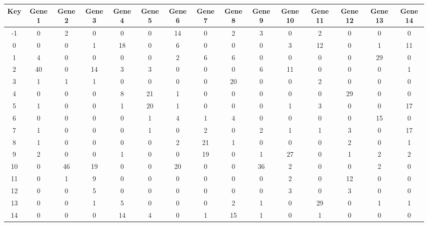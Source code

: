 \begin{tabular}{|c|c|c|c|c|c|c|c|c|c|c|c|c|c|c|}
\hline
Key & Gene 1 & Gene 2 & Gene 3 & Gene 4 & Gene 5 & Gene 6 & Gene 7 & Gene 8 & Gene 9 & Gene 10 & Gene 11 & Gene 12 & Gene 13 & Gene 14 \\
\hline
-1 & 0 & 2 & 0 & 0 & 0 & 14 & 0 & 2 & 3 & 0 & 2 & 0 & 0 & 0 \\
0 & 0 & 0 & 1 & 18 & 0 & 6 & 0 & 0 & 0 & 3 & 12 & 0 & 1 & 11 \\
1 & 4 & 0 & 0 & 0 & 0 & 2 & 6 & 6 & 0 & 0 & 0 & 0 & 29 & 0 \\
2 & 40 & 0 & 14 & 3 & 3 & 0 & 0 & 0 & 6 & 11 & 0 & 0 & 0 & 1 \\
3 & 1 & 1 & 1 & 0 & 0 & 0 & 0 & 20 & 0 & 0 & 2 & 0 & 0 & 0 \\
4 & 0 & 0 & 0 & 8 & 21 & 1 & 0 & 0 & 0 & 0 & 0 & 29 & 0 & 0 \\
5 & 1 & 0 & 0 & 1 & 20 & 1 & 0 & 0 & 0 & 1 & 3 & 0 & 0 & 17 \\
6 & 0 & 0 & 0 & 0 & 1 & 4 & 1 & 4 & 0 & 0 & 0 & 0 & 15 & 0 \\
7 & 1 & 0 & 0 & 0 & 1 & 0 & 2 & 0 & 2 & 1 & 1 & 3 & 0 & 17 \\
8 & 1 & 0 & 0 & 0 & 0 & 2 & 21 & 1 & 0 & 0 & 0 & 2 & 0 & 1 \\
9 & 2 & 0 & 0 & 1 & 0 & 0 & 19 & 0 & 1 & 27 & 0 & 1 & 2 & 2 \\
10 & 0 & 46 & 19 & 0 & 0 & 20 & 0 & 0 & 36 & 2 & 0 & 0 & 2 & 0 \\
11 & 0 & 1 & 9 & 0 & 0 & 0 & 0 & 0 & 0 & 2 & 0 & 12 & 0 & 0 \\
12 & 0 & 0 & 5 & 0 & 0 & 0 & 0 & 0 & 0 & 3 & 0 & 3 & 0 & 0 \\
13 & 0 & 0 & 1 & 5 & 0 & 0 & 0 & 2 & 1 & 0 & 29 & 0 & 1 & 1 \\
14 & 0 & 0 & 0 & 14 & 4 & 0 & 1 & 15 & 1 & 0 & 1 & 0 & 0 & 0 \\
\hline
\end{tabular}